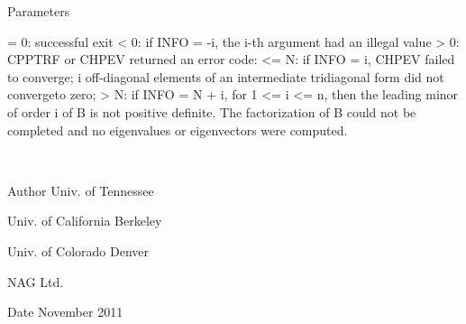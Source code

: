 \begin{DoxyParams}[1]{Parameters}
\begin{DoxyVerb}
          = 0:  successful exit
          < 0:  if INFO = -i, the i-th argument had an illegal value
          > 0:  CPPTRF or CHPEV returned an error code:
             <= N:  if INFO = i, CHPEV failed to converge;
                    i off-diagonal elements of an intermediate
                    tridiagonal form did not convergeto zero;
             > N:   if INFO = N + i, for 1 <= i <= n, then the leading
                    minor of order i of B is not positive definite.
                    The factorization of B could not be completed and
                    no eigenvalues or eigenvectors were computed.\end{DoxyVerb}
 \\
\hline
\end{DoxyParams}
\begin{DoxyAuthor}{Author}
Univ. of Tennessee 

Univ. of California Berkeley 

Univ. of Colorado Denver 

N\+A\+G Ltd. 
\end{DoxyAuthor}
\begin{DoxyDate}{Date}
November 2011 
\end{DoxyDate}
